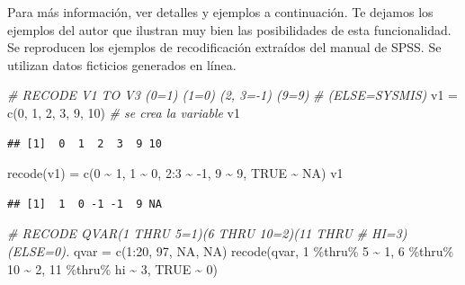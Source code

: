\documentclass[
]{book}
\newenvironment{Shaded}{\begin{snugshade}}{\end{snugshade}}
\newcommand{\CommentTok}[1]{\textcolor[rgb]{0.56,0.35,0.01}{\textit{#1}}}
\newcommand{\ConstantTok}[1]{\textcolor[rgb]{0.00,0.00,0.00}{#1}}
\newcommand{\DecValTok}[1]{\textcolor[rgb]{0.00,0.00,0.81}{#1}}
\newcommand{\FunctionTok}[1]{\textcolor[rgb]{0.00,0.00,0.00}{#1}}
\newcommand{\NormalTok}[1]{#1}
\newcommand{\OtherTok}[1]{\textcolor[rgb]{0.56,0.35,0.01}{#1}}
\newcommand{\SpecialCharTok}[1]{\textcolor[rgb]{0.00,0.00,0.00}{#1}}
\begin{document}
Para más información, ver detalles y ejemplos a continuación. Te dejamos los ejemplos del autor que ilustran muy bien las posibilidades de esta funcionalidad. Se reproducen los ejemplos de recodificación extraídos del manual de SPSS. Se utilizan datos ficticios generados en línea.

\begin{Shaded}
\begin{Highlighting}[]
\CommentTok{\# RECODE V1 TO V3 (0=1) (1=0) (2, 3={-}1) (9=9)}
\CommentTok{\# (ELSE=SYSMIS)}
\NormalTok{v1 }\OtherTok{=} \FunctionTok{c}\NormalTok{(}\DecValTok{0}\NormalTok{, }\DecValTok{1}\NormalTok{, }\DecValTok{2}\NormalTok{, }\DecValTok{3}\NormalTok{, }\DecValTok{9}\NormalTok{, }\DecValTok{10}\NormalTok{)  }\CommentTok{\# se crea la variable}
\NormalTok{v1}
\end{Highlighting}
\end{Shaded}

\begin{verbatim}
## [1]  0  1  2  3  9 10
\end{verbatim}

\begin{Shaded}
\begin{Highlighting}[]
\FunctionTok{recode}\NormalTok{(v1) }\OtherTok{=} \FunctionTok{c}\NormalTok{(}\DecValTok{0} \SpecialCharTok{\textasciitilde{}} \DecValTok{1}\NormalTok{, }\DecValTok{1} \SpecialCharTok{\textasciitilde{}} \DecValTok{0}\NormalTok{, }\DecValTok{2}\SpecialCharTok{:}\DecValTok{3} \SpecialCharTok{\textasciitilde{}} \SpecialCharTok{{-}}\DecValTok{1}\NormalTok{, }\DecValTok{9} \SpecialCharTok{\textasciitilde{}} \DecValTok{9}\NormalTok{, }\ConstantTok{TRUE} \SpecialCharTok{\textasciitilde{}} \ConstantTok{NA}\NormalTok{)}
\NormalTok{v1}
\end{Highlighting}
\end{Shaded}

\begin{verbatim}
## [1]  1  0 -1 -1  9 NA
\end{verbatim}

\begin{Shaded}
\begin{Highlighting}[]
\CommentTok{\# RECODE QVAR(1 THRU 5=1)(6 THRU 10=2)(11 THRU}
\CommentTok{\# HI=3)(ELSE=0).}
\NormalTok{qvar }\OtherTok{=} \FunctionTok{c}\NormalTok{(}\DecValTok{1}\SpecialCharTok{:}\DecValTok{20}\NormalTok{, }\DecValTok{97}\NormalTok{, }\ConstantTok{NA}\NormalTok{, }\ConstantTok{NA}\NormalTok{)}
\FunctionTok{recode}\NormalTok{(qvar, }\DecValTok{1} \SpecialCharTok{\%thru\%} \DecValTok{5} \SpecialCharTok{\textasciitilde{}} \DecValTok{1}\NormalTok{, }\DecValTok{6} \SpecialCharTok{\%thru\%} \DecValTok{10} \SpecialCharTok{\textasciitilde{}} \DecValTok{2}\NormalTok{, }\DecValTok{11} \SpecialCharTok{\%thru\%}\NormalTok{ hi }\SpecialCharTok{\textasciitilde{}}
  \DecValTok{3}\NormalTok{, }\ConstantTok{TRUE} \SpecialCharTok{\textasciitilde{}} \DecValTok{0}\NormalTok{)}
\end{Highlighting}
\end{Shaded}
\end{document}

